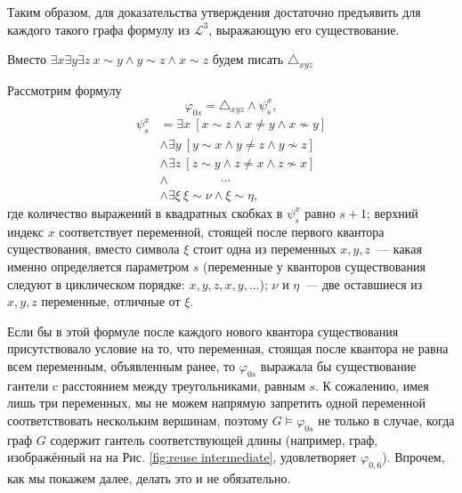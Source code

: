 Таким образом, для доказательства утверждения достаточно предъявить для каждого такого графа формулу из  $\mathcal{L}^3$, выражающую его существование.




Вместо 
$\exists x \exists y \exists z ~ x \sim y \wedge y \sim z \wedge x \sim z$
будем писать 
$\triangle_{xyz}$

Рассмотрим формулу
\[ \varphi_{0s} = \triangle_{xyz} \wedge \psi_s^{x},\]
\begin{equation}
\label{f:gantel}
\begin{split}
\psi_s^x &= \exists x ~ 
    \left[ x \sim z \wedge x \neq y \wedge x \nsim y  \right] \\
&\wedge \exists y ~
    \left[ y \sim x \wedge y \neq z \wedge y \nsim z \right] \\
&\wedge \exists z ~
    \left[ z \sim y \wedge z \neq x \wedge z \nsim x  \right] \\
&\wedge ~ \qquad \qquad \cdots \\
&\wedge \exists \xi ~ 
    \xi \sim \nu \wedge \xi \sim \eta,
\end{split}
\end{equation}
где количество выражений в квадратных скобках в $\psi_{s}^{x}$ равно $s+1$; верхний индекс $x$ соответствует переменной, стоящей после первого квантора существования, вместо символа $\xi$ стоит одна из переменных $x,y,z$~--- какая именно определяется параметром $s$ (переменные у кванторов существования следуют в циклическом порядке: $x,y,z,x,y, \ldots$); $\nu$ и $\eta$~--- две оставшиеся из $x,y,z$ переменные, отличные от $\xi$. 

Если бы в этой формуле после каждого нового квантора существования присутствовало условие на то, что переменная, стоящая после квантора не равна всем переменным, объявленным ранее, то $\varphi_{0s}$ выражала бы существование гантели c расстоянием между треугольниками, равным $s$.
К сожалению, имея лишь три переменных, мы не можем напрямую запретить одной переменной соответствовать нескольким вершинам, поэтому $G \vDash \varphi_{0s}$ не только в случае, когда граф $G$ содержит гантель соответствующей длины (например, граф, изображённый на на Рис. \ref{fig:reuse intermediate}, удовлетворяет $\varphi_{0,6}$).
Впрочем, как мы покажем далее, делать это и не обязательно.

